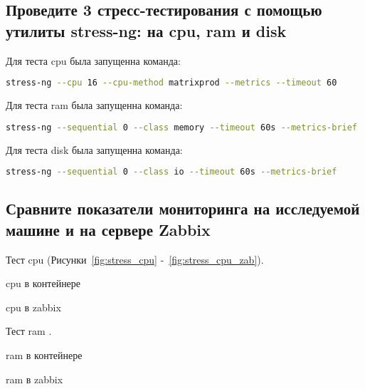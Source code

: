 \subsection{Проведите 3 стресс-тестирования с помощью утилиты stress-ng: на cpu, ram и
disk}

Для теста cpu была запущенна команда:

\begin{lstlisting}[language=bash]
stress-ng --cpu 16 --cpu-method matrixprod --metrics --timeout 60
\end{lstlisting}


Для теста ram была запущенна команда:

\begin{lstlisting}[language=bash]
stress-ng --sequential 0 --class memory --timeout 60s --metrics-brief
\end{lstlisting}


Для теста disk была запущенна команда:

\begin{lstlisting}[language=bash]
stress-ng --sequential 0 --class io --timeout 60s --metrics-brief
\end{lstlisting}

\subsection{Сравните показатели мониторинга на исследуемой машине  и на сервере Zabbix}

Тест cpu (Рисунки~\ref{fig:stress_cpu} -~\ref{fig:stress_cpu_zab}).

\begin{image}
    \caption{cpu в контейнере}
    \label{fig:stress_cpu}
\end{image}

\begin{image}
    \caption{cpu в zabbix}
    \label{fig:stress_cpu_zab}
\end{image}

\clearpage


Тест ram .

\begin{image}
    \caption{ram в контейнере}
    \label{fig:stress_ram}
\end{image}

\begin{image}
    \caption{ram в zabbix}
    \label{fig:stress_ram_zab}
\end{image}

